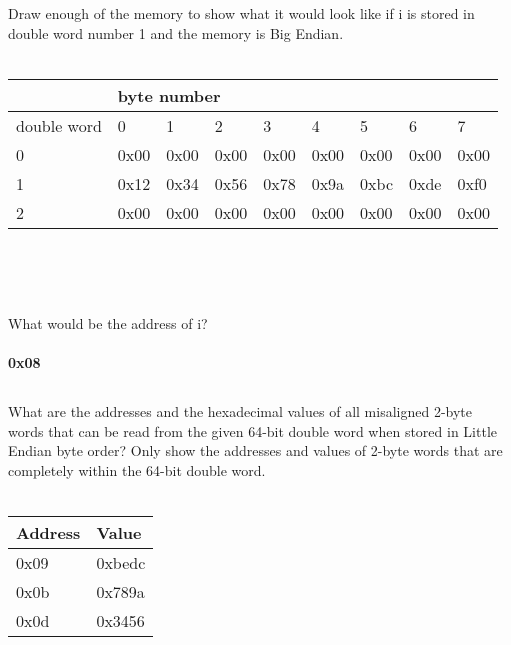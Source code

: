 \documentclass{article}
\begin{document}
\subsection{}
Draw enough of the memory to show what it would look like if i is stored in double word number 1 and the memory is Big Endian. \\
\\
\begin{tabular}{l|l|l|l|l|l|l|l|l|}
\cline{2-9}
 & \multicolumn{8}{|l|}{byte number} \\ \hline
\multicolumn{1}{|l|}{double word} & 0 & 1 & 2 & 3 & 4 & 5 & 6 & 7 \\ \hline
\multicolumn{1}{|l|}{0} & 0x00 & 0x00 & 0x00 & 0x00 & 0x00 & 0x00 & 0x00 & 0x00 \\ \hline
\multicolumn{1}{|l|}{1} & 0x12 & 0x34 & 0x56 & 0x78 & 0x9a & 0xbc & 0xde & 0xf0 \\ \hline
\multicolumn{1}{|l|}{2} & 0x00 & 0x00 & 0x00 & 0x00 & 0x00 & 0x00 & 0x00 & 0x00 \\ \hline
\end{tabular}\\
\\
\subsection{}
What would be the address of i? \\
\\
\textbf{0x08} \\
\subsection{}
What are the addresses and the hexadecimal values of all misaligned 2-byte words that can be read from the given 64-bit double word when stored in Little Endian byte order? Only show the addresses and values of 2-byte words that are completely within the 64-bit double word.\\
\\
\begin{tabular}{|l|l|}
\hline
Address & Value \\ 
\hline
0x09 & 0xbedc \\ \hline
0x0b & 0x789a \\ \hline
0x0d & 0x3456 \\ \hline
\end{tabular} \\
\\
\end{document}

